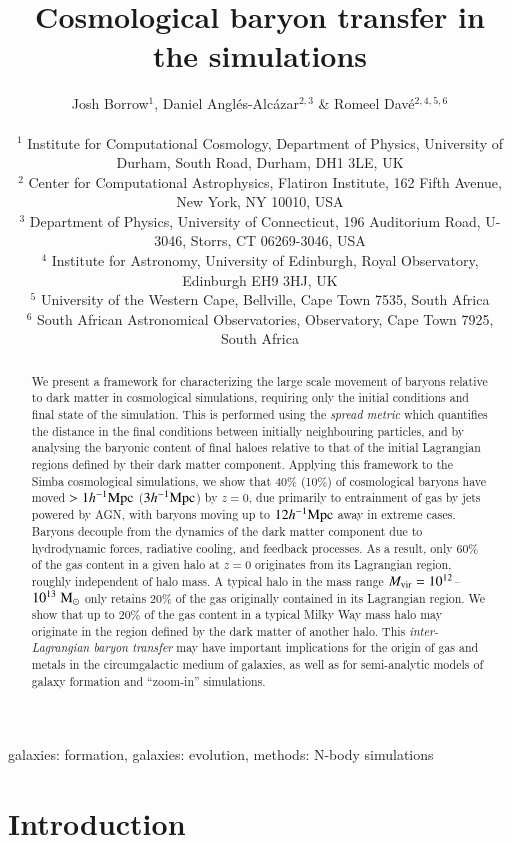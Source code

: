 \documentclass[fleqn,usenatbib]{mnras}
\title{Cosmological baryon transfer in the \simba{} simulations}
\author[Borrow et al.]{
Josh Borrow$^{1}$,
Daniel Angl\'es-Alc\'azar$^{2, 3}$ \&
Romeel Dav\'e$^{2, 4, 5, 6}$
\\
\\$^1$ Institute for Computational Cosmology, Department of Physics, University of Durham, South Road, Durham, DH1 3LE, UK
\\$^2$ Center for Computational Astrophysics, Flatiron Institute, 162 Fifth Avenue, New York, NY 10010, USA 
\\$^3$ Department of Physics, University of Connecticut, 196 Auditorium Road, U-3046, Storrs, CT 06269-3046, USA
\\$^4$ Institute for Astronomy, University of Edinburgh, Royal Observatory, Edinburgh EH9 3HJ, UK
\\$^5$ University of the Western Cape, Bellville, Cape Town 7535, South Africa
\\$^6$ South African Astronomical Observatories, Observatory, Cape Town 7925, South Africa
}
\newcommand{\hmpc}{h^{-1}{\rm Mpc}}
\newcommand{\msolar}{\;{\rm M}_{\odot}}
\newcommand{\simba}{{\sc Simba}}
\begin{document}
\maketitle

\begin{abstract}We present a framework for characterizing the large scale movement of baryons
relative to dark matter in cosmological simulations, requiring only the
initial conditions and final state of the simulation. This is performed using
the {\it spread metric} which quantifies the distance in the final conditions
between initially neighbouring particles, and by analysing the baryonic
content of final haloes relative to that of the initial Lagrangian regions
defined by their dark matter component. Applying this framework to the
\simba{} cosmological simulations, we show that 40\% (10\%) of cosmological
baryons have moved $> 1\hmpc{}$ ($3\hmpc{}$) by $z=0$, due primarily to
entrainment of gas by jets powered by AGN, with baryons moving up to
$12\hmpc{}$ away in extreme cases. Baryons
decouple from the dynamics of the dark matter component due to hydrodynamic
forces, radiative cooling, and feedback processes. As a result, only 60\% of
the gas content in a given halo at $z=0$ originates from its Lagrangian
region, roughly independent of halo mass. A typical halo in the mass range
$M_{\rm vir} = 10^{12}$--$10^{13}\msolar$ only retains 20\% of the gas
originally contained in its Lagrangian region. We show that up to 20\% of the
gas content in a typical Milky Way mass halo may originate in the region
defined by the dark matter of another halo. This {\it inter-Lagrangian baryon
transfer} may have important implications for the origin of gas and metals in
the circumgalactic medium of galaxies, as well as for semi-analytic models of
galaxy formation and ``zoom-in'' simulations. \end{abstract}

\begin{keywords}galaxies: formation, galaxies: evolution, methods: N-body simulations\end{keywords}

\section{Introduction}
\label{sec:introduction}
\end{document}
